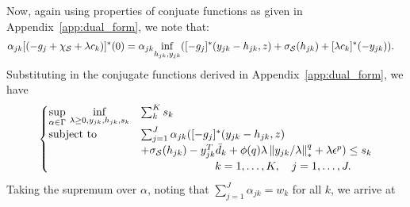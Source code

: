 {%
 Now, again using properties of conjuate functions as given in Appendix~\ref{app:dual_form}, we note that:
\begin{equation*}
	\begin{aligned}
		\alpha_{jk}[(-g_j +\chi_{\mathcal{S}} + \lambda c_k)]^* (0) &= \alpha_{jk}\underset{h_{jk},y_{jk}}{\inf} ([-g_j]^*(y_{jk} - h_{jk},z) + \sigma_{\mathcal{S}}(h_{jk}) + [\lambda c_k]^* (-y_{jk})).
	\end{aligned}
\end{equation*}
Substituting in the conjugate functions derived in Appendix~\ref{app:dual_form}, we have 
\begin{equation*}
	\begin{aligned}
\begin{cases}
	\underset{\alpha \in \Gamma}{\sup}~\underset{\lambda \geq 0, y_{jk},h_{jk}, s_k}{\inf} & \sum_k^K s_k\\
	\mbox{subject to} & \sum_{j=1}^J \alpha_{jk}([-g_j]^*(y_{jk} - h_{jk},z)\\
	& + \sigma_{\mathcal{S}}(h_{jk}) - y_{jk}^T\bar{d}_k + \phi(q)\lambda \left\|y_{jk}/\lambda \right\|^q_* + \lambda \epsilon^p ) \le s_k \\
	&\hspace{2cm} \quad k = 1,\dots,K, \quad j = 1,\dots,J.
\end{cases}
\end{aligned}
\end{equation*}
Taking the supremum over $\alpha$, noting that $\sum_{j=1}^J \alpha_{jk} = w_k$ for all $k$, we arrive at
}
